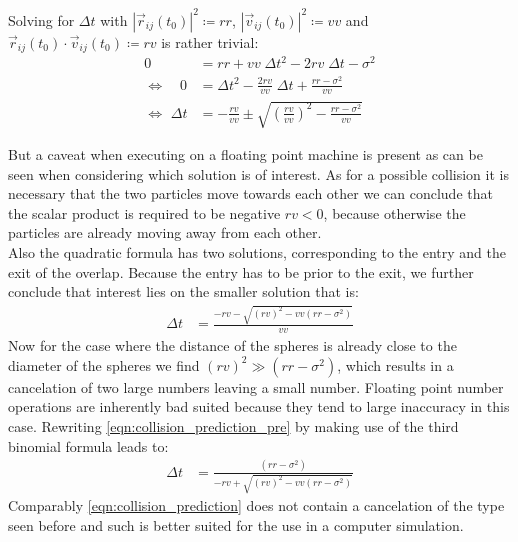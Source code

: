 Solving for $\Delta t$ with $|\vec{r}_{ij}(t_0)|^2 \coloneqq rr $, $|\vec{v}_{ij}(t_0)|^2 \coloneqq vv $ and  $\vec{r}_{ij}(t_0) \cdot \vec{v}_{ij}(t_0) \coloneqq rv $ is rather trivial:
\begin{align}
0 &= rr + vv \; \Delta t ^2  - 2 rv \; \Delta t  -\sigma^2\\
\Leftrightarrow \quad 0 &= \Delta t ^2 - \frac{2rv}{vv} \; \Delta t + \frac{rr - \sigma^2 }{vv}\\
\Leftrightarrow \, \, \Delta t &= - \frac{rv}{vv} \pm \sqrt{\left(\frac{rv}{vv}\right)^2 - \frac{rr - \sigma^2 }{vv}}
\end{align}

But a caveat when executing on a floating point machine is present as can be seen when considering which solution is of interest. As for a possible collision it is necessary that the two particles move towards each other we can conclude that the scalar product is required to be negative $rv<0$, because otherwise the particles are already moving away from each other.\\ 

Also the quadratic formula has two solutions, corresponding to the entry and the exit of the overlap. Because the entry has to be prior to the exit, we further conclude that interest lies on the smaller solution that is:
\begin{align}
\label{eqn:collision_prediction_pre}
\Delta t &= \frac{ - rv - \sqrt{ (rv)^2  - vv (rr - \sigma^2 )} }{vv}
\end{align}
Now for the case where the distance of the spheres is already close to the diameter of the spheres we find $(rv)^2 \gg (rr-\sigma^2)$, which results in a cancelation of two large numbers leaving a small number. Floating point number operations are inherently bad suited because they tend to large inaccuracy in this case. Rewriting \autoref{eqn:collision_prediction_pre} by making use of the third binomial formula  leads to:
\begin{align}
\label{eqn:collision_prediction}
\Delta t &= \frac{(rr - \sigma^2 )}{ - rv + \sqrt{ (rv)^2  - vv (rr - \sigma^2 )}}
\end{align}
Comparably \autoref{eqn:collision_prediction} does not contain a cancelation of the type seen before and such is better suited for the use in a computer simulation. \\

